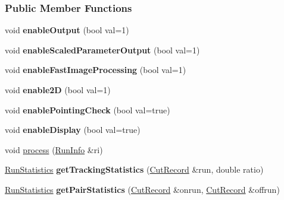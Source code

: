\subsubsection*{Public Member Functions}
\begin{DoxyCompactItemize}
\item 
\hypertarget{classCutter_af2b736c98364bced8a589af6c2a23876}{
void {\bfseries enableOutput} (bool val=1)}
\label{classCutter_af2b736c98364bced8a589af6c2a23876}

\item 
\hypertarget{classCutter_ae91898ee742899ce553a0950a4649d6e}{
void {\bfseries enableScaledParameterOutput} (bool val=1)}
\label{classCutter_ae91898ee742899ce553a0950a4649d6e}

\item 
\hypertarget{classCutter_af8f718594f826e6da8c3cb80b8e233cc}{
void {\bfseries enableFastImageProcessing} (bool val=1)}
\label{classCutter_af8f718594f826e6da8c3cb80b8e233cc}

\item 
\hypertarget{classCutter_a5074fd0776b5c706d6e4ec932fefd74f}{
void {\bfseries enable2D} (bool val=1)}
\label{classCutter_a5074fd0776b5c706d6e4ec932fefd74f}

\item 
\hypertarget{classCutter_a6f7d668a1314d47cf04c9f0ff512f00b}{
void {\bfseries enablePointingCheck} (bool val=true)}
\label{classCutter_a6f7d668a1314d47cf04c9f0ff512f00b}

\item 
\hypertarget{classCutter_a8a6b24a2596e6cb48e5a64583c9000cb}{
void {\bfseries enableDisplay} (bool val=true)}
\label{classCutter_a8a6b24a2596e6cb48e5a64583c9000cb}

\item 
void \hyperlink{classCutter_a2c7e98e45d19df45fb23652a4a40cf38}{process} (\hyperlink{classRunInfo}{RunInfo} \&ri)
\item 
\hypertarget{classCutter_afe5b50816216132d772fba55c84d4585}{
\hyperlink{structRunStatistics}{RunStatistics} {\bfseries getTrackingStatistics} (\hyperlink{structCutRecord}{CutRecord} \&run, double ratio)}
\label{classCutter_afe5b50816216132d772fba55c84d4585}

\item 
\hypertarget{classCutter_af137a9fa058a3e8b2428dcbc8d4edf4f}{
\hyperlink{structRunStatistics}{RunStatistics} {\bfseries getPairStatistics} (\hyperlink{structCutRecord}{CutRecord} \&onrun, \hyperlink{structCutRecord}{CutRecord} \&offrun)}
\label{classCutter_af137a9fa058a3e8b2428dcbc8d4edf4f}


\end{DoxyCompactItemize}
